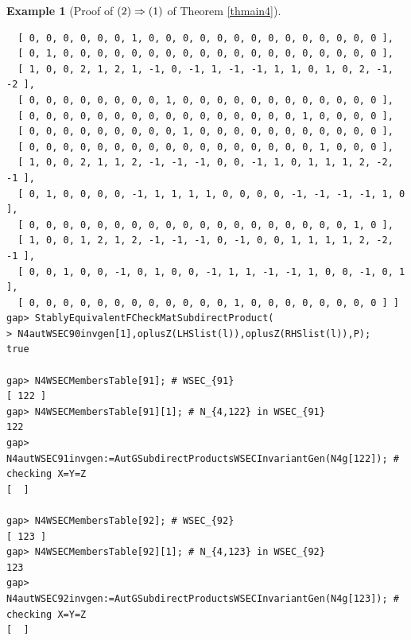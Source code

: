 \documentclass{amsart}
\theoremstyle{plain}
\theoremstyle{definition}
\newtheorem{example}[theorem]{Example}
\theoremstyle{remark}
\begin{document}
\begin{example}[Proof of ${\rm (2)}\Rightarrow {\rm (1)}$ of {Theorem \ref{thmain4}}]
\begin{verbatim}
  [ 0, 0, 0, 0, 0, 0, 1, 0, 0, 0, 0, 0, 0, 0, 0, 0, 0, 0, 0, 0, 0 ], 
  [ 0, 1, 0, 0, 0, 0, 0, 0, 0, 0, 0, 0, 0, 0, 0, 0, 0, 0, 0, 0, 0 ], 
  [ 1, 0, 0, 2, 1, 2, 1, -1, 0, -1, 1, -1, -1, 1, 1, 0, 1, 0, 2, -1, -2 ], 
  [ 0, 0, 0, 0, 0, 0, 0, 0, 1, 0, 0, 0, 0, 0, 0, 0, 0, 0, 0, 0, 0 ], 
  [ 0, 0, 0, 0, 0, 0, 0, 0, 0, 0, 0, 0, 0, 0, 0, 0, 1, 0, 0, 0, 0 ], 
  [ 0, 0, 0, 0, 0, 0, 0, 0, 0, 1, 0, 0, 0, 0, 0, 0, 0, 0, 0, 0, 0 ], 
  [ 0, 0, 0, 0, 0, 0, 0, 0, 0, 0, 0, 0, 0, 0, 0, 0, 0, 1, 0, 0, 0 ], 
  [ 1, 0, 0, 2, 1, 1, 2, -1, -1, -1, 0, 0, -1, 1, 0, 1, 1, 1, 2, -2, -1 ], 
  [ 0, 1, 0, 0, 0, 0, -1, 1, 1, 1, 1, 0, 0, 0, 0, -1, -1, -1, -1, 1, 0 ], 
  [ 0, 0, 0, 0, 0, 0, 0, 0, 0, 0, 0, 0, 0, 0, 0, 0, 0, 0, 0, 1, 0 ], 
  [ 1, 0, 0, 1, 2, 1, 2, -1, -1, -1, 0, -1, 0, 0, 1, 1, 1, 1, 2, -2, -1 ], 
  [ 0, 0, 1, 0, 0, -1, 0, 1, 0, 0, -1, 1, 1, -1, -1, 1, 0, 0, -1, 0, 1 ], 
  [ 0, 0, 0, 0, 0, 0, 0, 0, 0, 0, 0, 0, 1, 0, 0, 0, 0, 0, 0, 0, 0 ] ]
gap> StablyEquivalentFCheckMatSubdirectProduct(
> N4autWSEC90invgen[1],oplusZ(LHSlist(l)),oplusZ(RHSlist(l)),P);
true

gap> N4WSECMembersTable[91]; # WSEC_{91}
[ 122 ]
gap> N4WSECMembersTable[91][1]; # N_{4,122} in WSEC_{91}
122
gap> N4autWSEC91invgen:=AutGSubdirectProductsWSECInvariantGen(N4g[122]); # checking X=Y=Z
[  ]

gap> N4WSECMembersTable[92]; # WSEC_{92}
[ 123 ]
gap> N4WSECMembersTable[92][1]; # N_{4,123} in WSEC_{92}
123
gap> N4autWSEC92invgen:=AutGSubdirectProductsWSECInvariantGen(N4g[123]); # checking X=Y=Z
[  ]


\end{verbatim}
\end{example}
\end{document}
